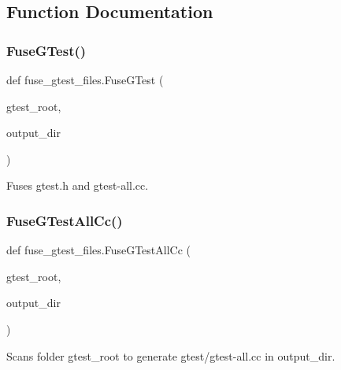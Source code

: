 \subsection{Function Documentation}
\mbox{\label{namespacefuse__gtest__files_a4e7007ceec3a7a25617eac3342563ed6}} 
\subsubsection{\texorpdfstring{FuseGTest()}{FuseGTest()}}
{\footnotesize\ttfamily def fuse\+\_\+gtest\+\_\+files.\+Fuse\+G\+Test (\begin{DoxyParamCaption}\item[{}]{gtest\+\_\+root,  }\item[{}]{output\+\_\+dir }\end{DoxyParamCaption})}

\begin{DoxyVerb}Fuses gtest.h and gtest-all.cc.\end{DoxyVerb}
 \mbox{\label{namespacefuse__gtest__files_a9bcdfab09f297e2b2097d9cdde5ee092}} 
\subsubsection{\texorpdfstring{FuseGTestAllCc()}{FuseGTestAllCc()}}
{\footnotesize\ttfamily def fuse\+\_\+gtest\+\_\+files.\+Fuse\+G\+Test\+All\+Cc (\begin{DoxyParamCaption}\item[{}]{gtest\+\_\+root,  }\item[{}]{output\+\_\+dir }\end{DoxyParamCaption})}

\begin{DoxyVerb}Scans folder gtest_root to generate gtest/gtest-all.cc in output_dir.\end{DoxyVerb}
 \mbox{\label{namespacefuse__gtest__files_ae0209897b164dbb8702169630f4bbf61}} 
